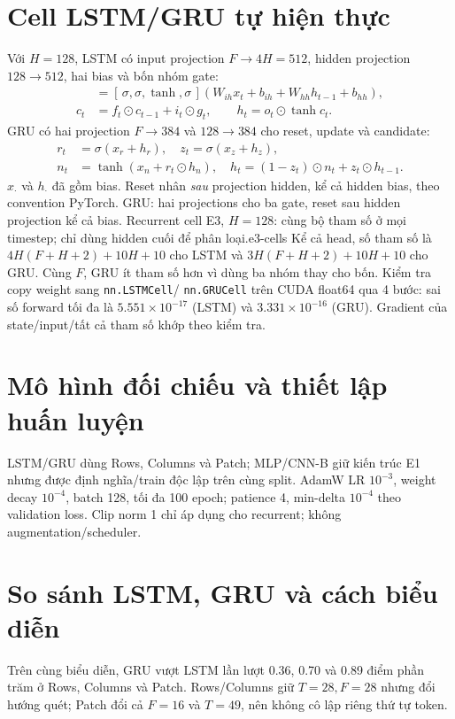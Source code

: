 \section{Cell LSTM/GRU tự hiện thực}
Với $ H=128$, LSTM có input projection $ F\to 4 H=512$, hidden projection
$128\to512$, hai bias và bốn nhóm gate:
\begin{align}
[i_t,f_t,g_t,o_t]&=\left[\,\sigma,\sigma,\tanh,\sigma\,\right]
(W_{ih}x_t+b_{ih}+W_{hh}h_{t-1}+b_{hh}),\\
c_t&=f_t\odot c_{t-1}+i_t\odot g_t,\qquad
h_t=o_t\odot\tanh c_t.
\end{align}
GRU có hai projection $ F\to 384$ và $128\to 384$ cho reset, update và candidate:
\begin{align}
r_t&=\sigma(x_r+h_r),\quad z_t=\sigma(x_z+h_z),\\
n_t&=\tanh(x_n+r_t\odot h_n),\quad
h_t=(1-z_t)\odot n_t+z_t\odot h_{t-1}.
\end{align}
$x_\cdot$ và $h_\cdot$ đã gồm bias. Reset nhân \emph{sau} projection hidden,
kể cả hidden bias, theo convention PyTorch.
{\ArchGRU}{GRU: hai projections cho ba gate, reset sau hidden projection kể cả bias.}
{Recurrent cell E3, $H=128$: cùng bộ tham số ở mọi timestep; chỉ dùng hidden cuối để phân loại.}{e3-cells}
Kể cả head, số tham số là $4 H(F+H+2)+10 H+10$ cho LSTM và
$3 H(F+H+2)+10 H+10$ cho GRU. Cùng $F$, GRU ít tham số hơn vì dùng
ba nhóm thay cho bốn. Kiểm tra copy weight sang \texttt{nn.LSTMCell}/
\texttt{nn.GRUCell} trên CUDA float64 qua 4 bước: sai số forward tối đa
là $5.551\times 10^{-17}$ (LSTM) và $3.331\times 10^{-16}$ (GRU).
Gradient của state/input/tất cả tham số khớp theo kiểm tra.

\section{Mô hình đối chiếu và thiết lập huấn luyện}
LSTM/GRU dùng Rows, Columns và Patch; MLP/CNN-B giữ kiến trúc E1 nhưng
được định nghĩa/train độc lập trên cùng split. AdamW LR $10^{-3}$,
weight decay $10^{-4}$, batch 128, tối đa 100 epoch; patience 4,
min-delta $10^{-4}$ theo validation loss.
Clip norm 1 chỉ áp dụng cho recurrent; không augmentation/scheduler.

\section{So sánh LSTM, GRU và cách biểu diễn}
Trên cùng biểu diễn, GRU vượt LSTM lần lượt 0.36, 0.70 và 0.89 điểm
phần trăm ở Rows, Columns và Patch. Rows/Columns giữ $T=28,F=28$ nhưng đổi
hướng quét; Patch đổi cả $F=16$ và $T=49$, nên không cô lập riêng thứ tự token.


